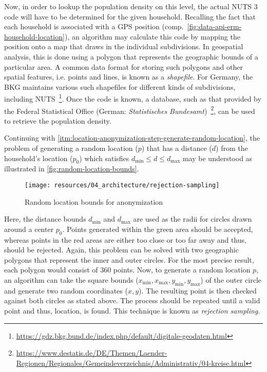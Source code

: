 Now, in order to lookup the population density on this level, the actual \acs{NUTS} 3 code will have to be determined for the given household. Recalling the fact that each household is associated with a \ac{GPS} position (comp.~\autoref{fig:data-api-erm-household-location}), an algorithm may calculate this code by mapping the position onto a map that draws in the individual subdivisions. In geospatial analysis, this is done using a polygon that represents the geographic bounds of a particular area. A common data format for storing such polygons and other spatial features, i.e. points and lines, is known as a \textit{shapefile}. For Germany, the \ac{BKG} maintains various such shapefiles for different kinds of subdivisions, including \acs{NUTS}~\footnote{\url{https://gdz.bkg.bund.de/index.php/default/digitale-geodaten.html}}. Once the code is known, a database, such as that provided by the Federal Statistical Office (German: \textit{Statistisches Bundesamt})~\footnote{\url{https://www.destatis.de/DE/Themen/Laender-Regionen/Regionales/Gemeindeverzeichnis/Administrativ/04-kreise.html}}, can be used to retrieve the population density.

Continuing with \ref{itm:location-anonymization-step-generate-random-location}, the problem of generating a random location ($p$) that has a distance ($d$) from the household's location ($p_0$) which satisfies $d_{\text{min}} \leq d \leq d_{\text{max}}$ may be understood as illustrated in \autoref{fig:random-location-bounds}.

\begin{figure}[hbt]
  \centering
  \texttt{[image: resources/04\_architecture/rejection-sampling]}
  \caption{Random location bounds for anonymization}
  \label{fig:random-location-bounds}
\end{figure}

Here, the distance bounds $d_{\text{min}}$ and $d_{\text{max}}$ are used as the radii for circles drawn around a center $p_0$. Points generated within the green area should be accepted, whereas points in the red areas are either too close or too far away and thus, should be rejected. Again, this problem can be solved with two geographic polygons that represent the inner and outer circles. For the most precise result, each polygon would consist of 360 points. Now, to generate a random location $p$, an algorithm can take the square bounds ($x_{\text{min}}, x_{\text{max}}, y_{\text{min}}, y_{\text{max}}$) of the outer circle and generate two random coordinates ($x,y$). The resulting point is then checked against both circles as stated above. The process should be repeated until a valid point and thus, location, is found. This technique is known as \textit{rejection sampling}.


